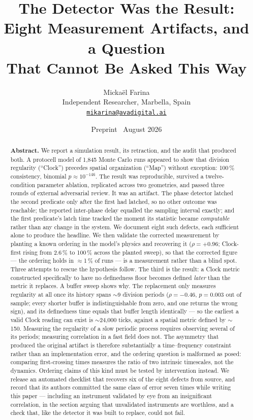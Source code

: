 \documentclass[11pt,letterpaper]{article}
\title{\textbf{The Detector Was the Result:\\
Eight Measurement Artifacts, and a Question\\
That Cannot Be Asked This Way}}
\author{%
  Micka\"el Farina\\
  \small Independent Researcher, Marbella, Spain\\
  \small \href{mailto:mikarina@avadigital.ai}{\texttt{mikarina@avadigital.ai}}
}
\date{\small Preprint \textperiodcentered\ August 2026}
\begin{document}
\maketitle
\thispagestyle{fancy}

\begin{abstract}
\noindent
\textbf{\upshape Abstract.} We report a simulation result, its
retraction, and the audit that produced both. A protocell model of
1{,}845 Monte Carlo runs appeared to show that division regularity
(``Clock'') precedes spatial organization (``Map'') without exception:
100\,\% consistency, binomial $p \approx 10^{-146}$. The result was
reproducible, survived a twelve-condition parameter ablation,
replicated across two geometries, and passed three rounds of external
adversarial review. It was an artifact. The phase detector latched the
second predicate only after the first had latched, so no other outcome
was reachable; the reported inter-phase delay equalled the sampling
interval exactly; and the first predicate's latch time tracked the
moment its statistic became \emph{computable} rather than any change in
the system. We document eight such defects, each sufficient alone to
produce the headline. We then validate the corrected measurement by
planting a known ordering in the model's physics and recovering it
($\rho = +0.96$; Clock-first rising from 2.6\,\% to 100\,\% across the
planted sweep), so that the corrected figure --- the ordering holds in
$\approx$1\,\% of runs --- is a measurement rather than a blind spot.
Three attempts to rescue the hypothesis follow. The third is the
result: a Clock metric constructed specifically to have no definedness
floor becomes defined \emph{later} than the metric it replaces. A
buffer sweep shows why. The replacement only measures regularity at all
once its history spans $\sim$9 division periods ($\rho = -0.46$,
$p = 0.003$ out of sample; every shorter buffer is indistinguishable
from zero, and one returns the wrong sign), and
its definedness time equals that buffer length identically --- so the
earliest a valid Clock reading can exist is $\sim$24{,}000 ticks,
against a spatial metric defined by $\sim$150. Measuring the regularity
of a slow periodic process requires observing several of its periods;
measuring correlation in a fast field does not. The asymmetry that
produced the original artifact is therefore substantially a
time--frequency constraint rather than an implementation error, and the
ordering question is malformed as posed: comparing first-crossing times
measures the ratio of two intrinsic timescales, not the dynamics.
Ordering claims of this kind must be tested by intervention instead. We
release an automated checklist that recovers six of the eight defects
from source, and record that its authors committed the same class of
error seven times while writing this paper --- including an instrument
validated by eye from an insignificant correlation, in the section
arguing that unvalidated instruments are worthless, and a check that,
like the detector it was built to replace, could not fail.


\end{abstract}
\end{document}
